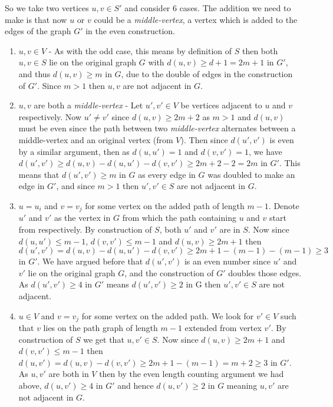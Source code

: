 \documentclass[10pt, a4paper]{article}
\theoremstyle{definition}
\begin{document}
So we take two vertices $u,v \in S'$ and consider 6 cases. The addition we need to make is that now $u$ or $v$ could be a \emph{middle-vertex}, a vertex which is added to the edges of the graph $G'$ in the even construction.

\begin{enumerate}
	\item $u,v \in V$ - As with the odd case, this means by definition of $S$ then both $u,v \in S$ lie on the original graph $G$ with $d(u,v) \geq d + 1 = 2m + 1$ in $G'$, and thus $d(u,v) \geq m$ in $G$, due to the double of edges in the construction of $G'$. Since $m > 1$ then $u,v$ are not adjacent in $G$.

	\item $u,v$ are both a \emph{middle-vertex} - Let $u',v' \in V$ be vertices adjacent to $u$ and $v$ respectively. Now $u' \neq v'$ since $d(u,v) \geq 2m + 2$ as $m>1$ and $d(u,v)$ must be even since the path between two \emph{middle-vertex} alternates between a middle-vertex and an original vertex (from $V$). Then since $d(u',v')$ is even by a similar argument, then as $d(u,u') = 1$ and $d(v,v') = 1$, we have $d(u',v') \geq d(u,v) - d(u,u') - d(v,v') \geq 2m + 2 - 2  = 2m$ in $G'$. This means that $d(u',v') \geq m$ in $G$ as every edge in $G$ was doubled to make an edge in $G'$, and since $m > 1$ then $u',v' \in S$ are not adjacent in $G$.  

	\item $u = u_i$ and $ v = v_j$ for some vertex on the added path of length $m-1$. Denote $u'$ and $v'$ as the vertex in $G$ from which the path containing $u$ and $v$ start from respectively. By construction of $S$, both $u'$ and $v'$ are in $S$. Now since $d(u,u') \leq m-1$, $d(v,v') \leq m-1$ and $d(u,v) \geq 2m + 1$ then $d(u',v') = d(u,v) - d(u,u') - d(v,v') \geq 2m + 1 - (m-1) - (m-1) \geq 3$ in $G'$. We have argued before that $d(u',v')$ is an even number since $u'$ and $v'$ lie on the original graph $G$, and the construction of $G'$ doubles those edges. As $d(u',v') \geq 4$ in $G'$ means $d(u',v') \geq 2$ in G then $u',v' \in S$ are not adjacent.

	\item $u \in V$ and $v = v_j$ for some vertex on the added path. We look for $v' \in V$ such that $v$ lies on the path graph of length $m-1$ extended from vertex $v'$. By construction of $S$ we get that $u,v' \in S$. Now since $d(u,v) \geq 2m+1$ and $d(v,v') \leq m - 1$ then $d(u,v') = d(u,v) - d(v,v') \geq 2m + 1 - (m-1) = m + 2 \geq 3$ in $G'$. As $u,v'$ are both in $V$ then by the even length counting argument we had above, $d(u,v') \geq 4$ in $G'$ and hence $d(u,v') \geq 2$ in $G$ meaning $u,v'$ are not adjacent in $G$.


\end{enumerate}
\end{document}
